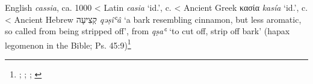\begin{etymology}\label{ety:cassia}
English \textit{cassia}, ca. 1000
< Latin \textit{casia} `id.',  c. \AD{}
< Ancient Greek {κασία} \textit{kasía} `id.',  c. \BC{}
< Ancient Hebrew {קְצִיעָה} \textit{qəṣîʿâ} `a bark resembling cinnamon, but less aromatic, so called from being stripped off', from \textit{qṣaʿ} `to cut off, strip off bark' (hapax legomenon in the Bible; Ps. 45:9)\footnote{\textcite[cassia]{oed}; \textcite{rosol_early_2018}; \textcite[653]{beekes_etymological_2010}; \textcite[589]{klein_comprehensive_1987}}
\end{etymology}